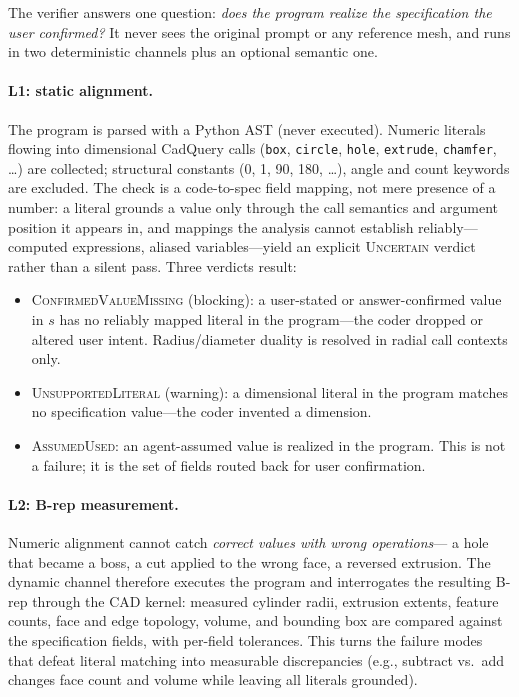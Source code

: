 The verifier answers one question: \emph{does the program realize the
specification the user confirmed?} It never sees the original prompt or any
reference mesh, and runs in two deterministic channels plus an optional
semantic one.

\paragraph{L1: static alignment.}
The program is parsed with a Python AST (never executed). Numeric literals
flowing into dimensional CadQuery calls (\texttt{box}, \texttt{circle},
\texttt{hole}, \texttt{extrude}, \texttt{chamfer}, \dots) are collected;
structural constants (0, 1, 90, 180, \dots), angle and count keywords are
excluded. The check is a code-to-spec field mapping, not mere presence of a
number: a literal grounds a value only through the call semantics and
argument position it appears in, and mappings the analysis cannot establish
reliably---computed expressions, aliased variables---yield an explicit
\textsc{Uncertain} verdict rather than a silent pass. Three verdicts result:
\begin{itemize}
  \item \textsc{ConfirmedValueMissing} (blocking): a user-stated or
  answer-confirmed value in $s$ has no reliably mapped literal in the
  program---the coder dropped or altered user intent. Radius\slash diameter
  duality is resolved in radial call contexts only.
  \item \textsc{UnsupportedLiteral} (warning): a dimensional literal in the
  program matches no specification value---the coder invented a dimension.
  \item \textsc{AssumedUsed}: an agent-assumed value is realized in the
  program. This is not a failure; it is the set of fields routed back for
  user confirmation.
\end{itemize}

\paragraph{L2: B-rep measurement.}
Numeric alignment cannot catch \emph{correct values with wrong operations}---
a hole that became a boss, a cut applied to the wrong face, a reversed
extrusion. The dynamic channel therefore executes the program and interrogates
the resulting B-rep through the CAD kernel: measured cylinder radii, extrusion
extents, feature counts, face and edge topology, volume, and bounding box are
compared against the specification fields, with per-field tolerances. This
turns the failure modes that defeat literal matching into measurable
discrepancies (e.g., subtract vs.\ add changes face count and volume while
leaving all literals grounded).

